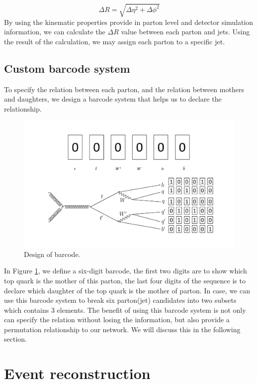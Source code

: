\begin{equation}
	\Delta R = \sqrt{\Delta\eta^{2} + \Delta\phi^{2}}
\end{equation}
By using the kinematic properties provide in parton level and detector simulation information, we can calculate the $\Delta R$ value between each parton and jets. Using the result of the calculation, we may assign each parton to a specific jet. 

\subsection{Custom barcode system}\label{subsec:barcode}
To specify the relation between each parton, and the relation between mothers and daughters, we design a barcode system that helps us to declare the relationship.

\begin{figure}[h!]
	\includegraphics[width=0.8\linewidth]{Figures/barcode.pdf}
	\caption{Design of barcode.}
	\label{fig:barcode}
\end{figure}

In Figure \ref{fig:barcode}, we define a six-digit barcode, the first two digits are to show which top quark is the mother of this parton, the last four digits of the sequence is to declare which daughter of the top quark is the mother of parton. In case, we can use this barcode system to break six parton(jet) candidates into two subsets which contains 3 elements. The benefit of using this barcode system is not only can specify the relation without losing the information, but also provide a permutation relationship to our network. We will discuss this in the following section.

\section{Event reconstruction}\label{sec:Event reconstruction}

